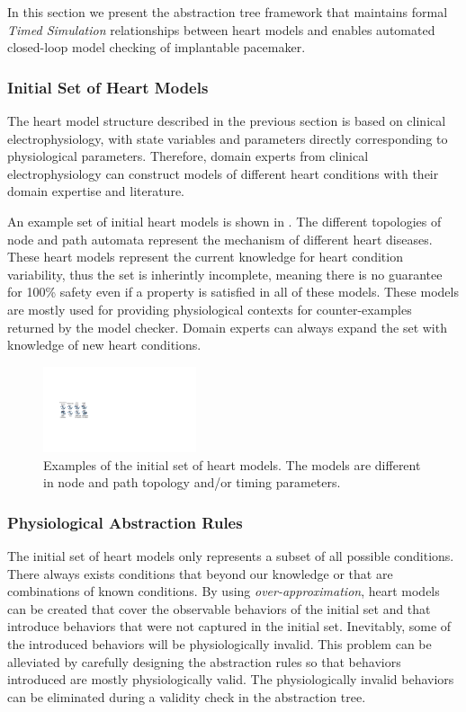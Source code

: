 In this section we present the abstraction tree framework that maintains formal \emph{Timed Simulation} relationships between heart models and enables automated closed-loop model checking of implantable pacemaker. %
\subsubsection{Initial Set of Heart Models}
The heart model structure described in the previous section is based on clinical electrophysiology, with state variables and parameters directly corresponding to physiological parameters.
Therefore, domain experts from clinical electrophysiology can construct models of different heart conditions with their domain expertise and literature.

An example set of initial heart models is shown in .
The different topologies of node and path automata represent the mechanism of different heart diseases.
These heart models represent the current knowledge for heart condition variability, thus the set is inherintly incomplete, meaning there is no guarantee for 100\% safety even if a property is satisfied in all of these models.
These models are mostly used for providing physiological contexts for counter-examples returned by the model checker.
Domain experts can always expand the set with knowledge of new heart conditions.
\begin{figure}[!h]
	\centering
	\includegraphics[width=0.4\textwidth]{figs/init.pdf}
	\vspace{-10pt}
	\caption{\small Examples of the initial set of heart models. The models are different in node and path topology and/or timing parameters.}
	\vspace{-10pt}
	\label{fig:init}
\end{figure}
\subsubsection{Physiological Abstraction Rules}
The initial set of heart models only represents a subset of all possible conditions.
There always exists conditions that beyond our knowledge or that are combinations of known conditions.
By using \emph{over-approximation}, heart models can be created that cover the observable behaviors of the initial set and that introduce behaviors that were not captured in the initial set.
Inevitably, some of the introduced behaviors will be physiologically invalid.
This problem can be alleviated by carefully designing the abstraction rules so that behaviors introduced are mostly physiologically valid.
The physiologically invalid behaviors can be eliminated during a validity check in the abstraction tree.

